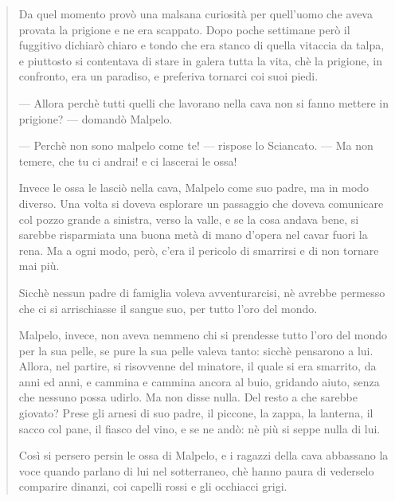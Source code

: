 \documentclass{book}
\newcounter{mar}
\begin{document}
\begin{quote}
 Da quel momento provò una malsana curiosità per quell’uomo che aveva provata la prigione e ne era scappato. Dopo poche settimane però il fuggitivo dichiarò chiaro e tondo che era stanco di quella vitaccia da talpa, e piuttosto si contentava di stare in galera tutta la vita, chè la prigione, in confronto, era un paradiso, e preferiva tornarci coi suoi piedi.
 
 — Allora perchè tutti quelli che lavorano nella cava non si fanno mettere in prigione? — domandò Malpelo.
 
 — Perchè non sono malpelo come te! — rispose lo Sciancato. — Ma non temere, che tu ci andrai! e ci lascerai le ossa!
 
 Invece le ossa le lasciò nella cava, Malpelo come suo padre, ma in modo diverso. Una volta si doveva esplorare un passaggio che doveva comunicare col pozzo grande a sinistra, verso la valle, e se la cosa andava bene, si sarebbe risparmiata una buona metà di mano d’opera nel cavar fuori la rena. Ma a ogni modo, però, c’era il pericolo di smarrirsi e di non tornare mai più. 
 
 Sicchè nessun padre di famiglia voleva avventurarcisi, nè avrebbe permesso che ci si arrischiasse il sangue suo, per tutto l’oro del mondo.
 
 Malpelo, invece, non aveva nemmeno chi si prendesse tutto l’oro del mondo per la sua pelle, se pure la sua pelle valeva tanto: sicchè pensarono a lui. Allora, nel partire, si risovvenne del minatore, il quale si era smarrito, da anni ed anni, e cammina e cammina ancora al buio, gridando aiuto, senza che nessuno possa udirlo. Ma non disse nulla. Del resto a che sarebbe giovato? Prese gli arnesi di suo padre, il piccone, la zappa, la lanterna, il sacco col pane, il fiasco del vino, e se ne andò: nè più si seppe nulla di lui.
 
 Così si persero persin le ossa di Malpelo, e i ragazzi della cava abbassano la voce quando parlano di lui nel sotterraneo, chè hanno paura di vederselo comparire dinanzi, coi capelli rossi e gli occhiacci grigi.
\end{quote}
\end{document}
